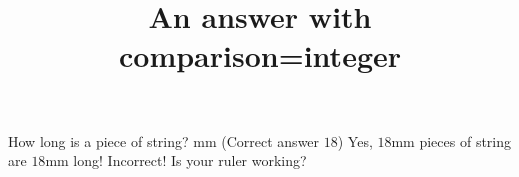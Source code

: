\documentclass[hidesidemenu]{webquiz}
\title{An answer with comparison=integer}
\begin{document}
  \begin{question}     %
     How long is a piece of string?
      mm (Correct answer $18$)
     \whenRight Yes, $18$mm pieces of string are $18$mm long!
     \whenWrong Incorrect! Is your ruler working?
  \end{question}
\end{document}
